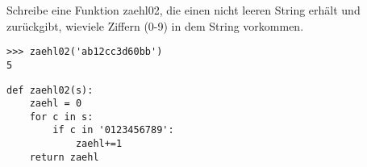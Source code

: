 \question[3] Schreibe eine Funktion zaehl02, die einen nicht leeren String erhält und zurückgibt,
wieviele Ziffern (0-9) in dem String vorkommen.
\begin{lstlisting}
>>> zaehl02('ab12cc3d60bb')
5
\end{lstlisting}
\begin{solutionbox}{4cm}
\begin{lstlisting}
def zaehl02(s):
    zaehl = 0
    for c in s:
        if c in '0123456789':
            zaehl+=1
    return zaehl
\end{lstlisting}
\end{solutionbox}
